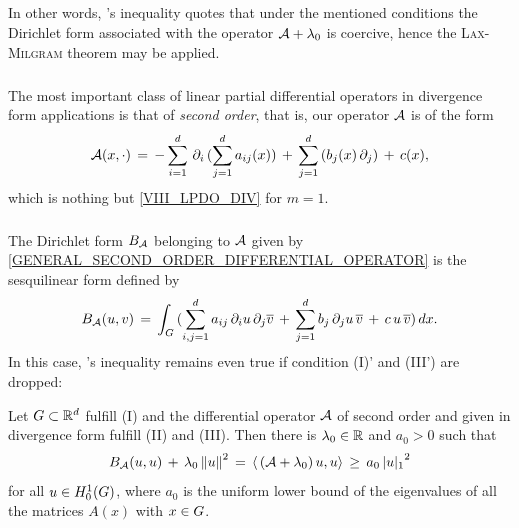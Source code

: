\documentclass[11pt,twoside]{article}
\begin{document}
\subparagraph*{}
In other words,
\textsc{{\GARDING}}'s inequality quotes that
under the mentioned conditions the Dirichlet form associated with
the operator ${\mathcal{A}} + \lambda_0$ is coercive,
hence the \textsc{Lax-Milgram} theorem may be applied.

\subparagraph*{} %
The most important class of linear partial differential operators
in divergence form {\wrt} applications is that of \textit{second order},
that is,
our operator ${\mathcal{A}}$ is of the form
\begin{equation}\label{GENERAL_SECOND_ORDER_DIFFERENTIAL_OPERATOR}
{\mathcal{A}}(x,\cdot) \,=\, 
-\sum_{i=1}^d \,
\partial_i \, (\sum_{j=1}^d a_{ij}(x)) 
\, + \,
\sum_{j=1}^d \, (b_j(x) \, \partial_j)
\, + \,
c(x),
\end{equation}
which is nothing but \eqref{VIII_LPDO_DIV} for $m=1$.

\subparagraph*{} %
The Dirichlet form $B_{{\mathcal{A}}}$ belonging to ${\mathcal{A}}$ 
given by \eqref{GENERAL_SECOND_ORDER_DIFFERENTIAL_OPERATOR}
is the sesquilinear form defined by
\begin{equation}\label{GENERAL_SECOND_ORDER_DIRICHLET_FORM}
B_{{\mathcal{A}}}(u,v) \,=\, \int_{G} \,
(\sum_{i,j=1}^d a_{ij} \, \partial_i u \, \partial_j \overline{v} \, + \,
 \sum_{j=1}^d b_j \, \partial_j u \, \overline{v} \, + \,
 c \,u \, \overline{v}
)
\, dx.
\end{equation}
In this case,
\textsc{\GARDING}'s inequality remains even true
if condition (I)' and (III') are dropped:

\begin{theorem}\label{GARDING_INEQUALITY_THEOREM_II}
Let $G \subset {\mathbb{R}}^d$ fulfill (I) and
the differential operator ${\mathcal{A}}$ of second order and given in divergence form
fulfill (II) and (III).
Then there is $\lambda_0 \in {\mathbb{R}}$ and $a_0 > 0$ such that
\[
\DF_{\A}(u,u) \, + \, \lambda_0 \norm{u}^2
\=
\scalar{\,(\A+\lambda_0)\,u}{u}
\, \geq \,
a_0 \, {\abs{u} _1}^2
\]
for all $u \in H_0^{1}(G)$,
where $a_0$ is the uniform lower bound of the eigenvalues of all the matrices
$A(x)$ with $x \in G$.
\end{theorem}
\end{document}
